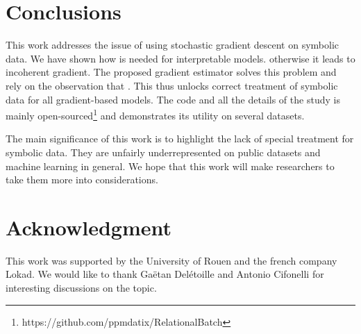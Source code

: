 \section{Conclusions}\label{sec:conclusion}









This work addresses the issue of using stochastic gradient descent on symbolic data. We have shown how \ohe is needed for interpretable models. \secondContrib  otherwise it leads to incoherent gradient. The proposed gradient estimator solves this problem and rely on the observation that \mainContrib. This thus unlocks correct treatment of symbolic data for all gradient-based models. The code and all the details of the study is mainly open-sourced\footnote{https://github.com/ppmdatix/RelationalBatch} and demonstrates its utility on several datasets. 



The main significance of this work is to highlight the lack of special treatment for symbolic data. They are unfairly underrepresented on public datasets and machine learning in general. We hope that this work will make researchers to take them more into considerations. 




\section*{Acknowledgment}
This work was supported by the University of Rouen and the french company Lokad. We would like to thank Gaëtan Delétoille and Antonio Cifonelli for interesting discussions on the topic. 